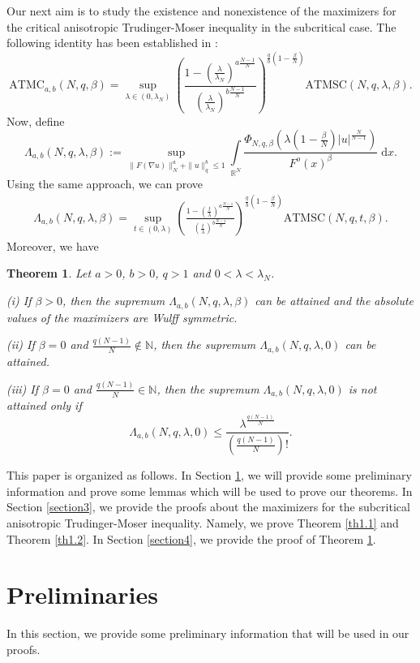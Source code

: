 \documentclass[11pt]{article}
\theoremstyle{plain}
\newtheorem{theorem}{Theorem}[section]
\numberwithin{equation}{section}
\newcommand{\R}{\mathbb{R}}
\newcommand{\N}{\mathbb{N}}
\begin{document}
Our next aim is to study the existence and nonexistence of the maximizers for the critical anisotropic Trudinger-Moser inequality in the subcritical case. The following identity has been established in \cite{Guo-Liu-2024}:
$$
{\mathrm{ATMC}}_{a,b}(N,q,\beta)=\sup\limits_{\lambda\in(0,\lambda_{N})}
\left(\frac{1-(\frac{\lambda}{\lambda_{N}})^{a\frac{N-1}{N}}}{(\frac{\lambda}{\lambda_{N}})^{b\frac{N-1}{N}}}\right)^{\frac{q}{b}(1-\frac{\beta}{N})}{\mathrm{ATMSC}}(N,q,\lambda,\beta).
$$
Now, define
$$
\Lambda_{a,b}(N,q,\lambda,\beta):=\sup\limits_{\|F(\nabla u)\|_{N}^{a}+\|u\|_{q}^{b}\leq 1}\int\limits_{\R^{N}}\frac{\Phi_{N,q,\beta}(\lambda(1-\frac{\beta}{N})\lvert u\rvert^{\frac{N}{N-1}})}{F^{o}(x)^{\beta}}\;\mathrm{d}x.
$$
Using the same approach, we can prove
\begin{align}\label{AA}
    \Lambda_{a,b}(N,q,\lambda,\beta)=\sup\limits_{t\in(0,\lambda)}\left(\frac{1-(\frac{t}{\lambda})^{a\frac{N-1}{N}}}{(\frac{t}{\lambda})^{b\frac{N-1}{N}}}\right)^{\frac{q}{b}(1-\frac{\beta}{N})}{\mathrm{ATMSC}}(N,q,t,\beta).
\end{align}
Moreover, we have
\begin{theorem}\label{th1.3}
    Let $a>0$, $b>0$, $q>1$ and $0<\lambda<\lambda_{N}$.

    \textup{(i)} If $\beta>0$, then the supremum $\Lambda_{a,b}(N,q,\lambda,\beta)$ can be attained and the absolute values of the maximizers are Wulff symmetric.

    \textup{(ii)} If $\beta=0$ and $\frac{q(N-1)}{N}\not\in\N$, then the supremum $\Lambda_{a,b}(N,q,\lambda, 0)$ can be attained.

    \textup{(iii)} If $\beta=0$ and $\frac{q(N-1)}{N}\in\N$, then the supremum $\Lambda_{a,b}(N,q,\lambda, 0)$ is not attained only if $$\Lambda_{a,b}(N,q,\lambda,0)\leq\frac{\lambda^{\frac{q(N-1)}{N}}}{\left(\frac{q(N-1)}{N}\right)!}.$$
\end{theorem}

This paper is organized as follows. In Section \ref{section2}, we will provide some preliminary information and prove some lemmas which will be used to prove our theorems. In Section \ref{section3}, we provide the proofs about the maximizers for the subcritical anisotropic Trudinger-Moser inequality. Namely, we prove Theorem \ref{th1.1} and Theorem \ref{th1.2}. In Section \ref{section4}, we provide the proof of Theorem \ref{th1.3}.
\section{Preliminaries}\label{section2}
In this section, we provide some preliminary information that will be used in our proofs.
\end{document}
